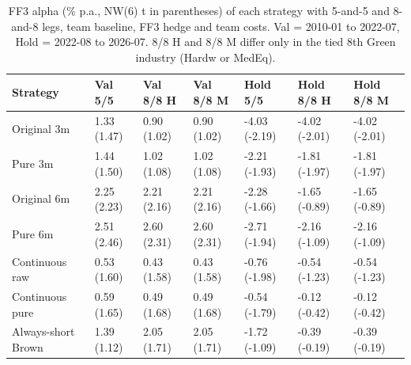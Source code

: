 \begin{table}
\caption{FF3 alpha (\% p.a., NW(6) t in parentheses) of each strategy with 5-and-5 and 8-and-8 legs, team baseline, FF3 hedge and team costs. Val = 2010-01 to 2022-07, Hold = 2022-08 to 2026-07. 8/8 H and 8/8 M differ only in the tied 8th Green industry (Hardw or MedEq).}
\label{tab:m2_q1_team}
\begin{tabular}{lllllll}
\toprule
Strategy & Val 5/5 & Val 8/8 H & Val 8/8 M & Hold 5/5 & Hold 8/8 H & Hold 8/8 M \\
\midrule
Original 3m & 1.33 (1.47) & 0.90 (1.02) & 0.90 (1.02) & -4.03 (-2.19) & -4.02 (-2.01) & -4.02 (-2.01) \\
Pure 3m & 1.44 (1.50) & 1.02 (1.08) & 1.02 (1.08) & -2.21 (-1.93) & -1.81 (-1.97) & -1.81 (-1.97) \\
Original 6m & 2.25 (2.23) & 2.21 (2.16) & 2.21 (2.16) & -2.28 (-1.66) & -1.65 (-0.89) & -1.65 (-0.89) \\
Pure 6m & 2.51 (2.46) & 2.60 (2.31) & 2.60 (2.31) & -2.71 (-1.94) & -2.16 (-1.09) & -2.16 (-1.09) \\
Continuous raw & 0.53 (1.60) & 0.43 (1.58) & 0.43 (1.58) & -0.76 (-1.98) & -0.54 (-1.23) & -0.54 (-1.23) \\
Continuous pure & 0.59 (1.65) & 0.49 (1.68) & 0.49 (1.68) & -0.54 (-1.79) & -0.12 (-0.42) & -0.12 (-0.42) \\
Always-short Brown & 1.39 (1.12) & 2.05 (1.71) & 2.05 (1.71) & -1.72 (-1.09) & -0.39 (-0.19) & -0.39 (-0.19) \\
\bottomrule
\end{tabular}
\end{table}
